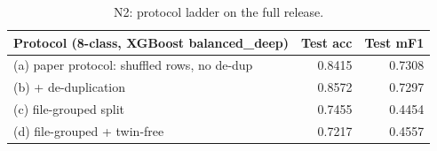 \begin{table}[!t]
\centering
\caption{N2: protocol ladder on the full release.}\label{tab:n2}
\scriptsize
\setlength{\tabcolsep}{3pt}
\begin{tabular}{p{4.6cm}rr}
\toprule
\textbf{Protocol (8-class, XGBoost balanced\_deep)} & \textbf{Test acc} & \textbf{Test mF1} \\
\midrule
(a) paper protocol: shuffled rows, no de-dup & 0.8415 & 0.7308 \\
(b) + de-duplication & 0.8572 & 0.7297 \\
(c) file-grouped split & 0.7455 & 0.4454 \\
(d) file-grouped + twin-free & 0.7217 & 0.4557 \\
\bottomrule
\end{tabular}
\end{table}
